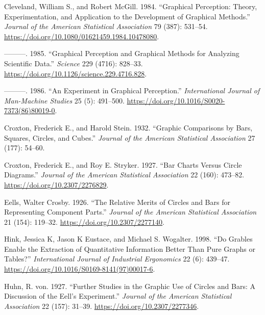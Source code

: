 \documentclass[
  10pt,
  letterpaper,
  twocolumn]{article}
\newlength{\cslhangindent}
\newlength{\cslentryspacingunit} %
\newenvironment{CSLReferences}[2] %
 {%
  \setlength{\parindent}{0pt}
  \ifodd #1
  \let\oldpar\par
  \def\par{\hangindent=\cslhangindent\oldpar}
  \fi
  \setlength{\parskip}{#2\cslentryspacingunit}
 }%
 {}
\begin{document}
\hypertarget{refs}{}
\begin{CSLReferences}{1}{0}
\leavevmode{}%
Cleveland, William S., and Robert McGill. 1984. {``Graphical Perception:
Theory, Experimentation, and Application to the Development of Graphical
Methods.''} \emph{Journal of the American Statistical Association} 79
(387): 531--54. \url{https://doi.org/10.1080/01621459.1984.10478080}.

\leavevmode{}%
---------. 1985. {``Graphical Perception and Graphical Methods for
Analyzing Scientific Data.''} \emph{Science} 229 (4716): 828--33.
\url{https://doi.org/10.1126/science.229.4716.828}.

\leavevmode{}%
---------. 1986. {``An Experiment in Graphical Perception.''}
\emph{International Journal of Man-Machine Studies} 25 (5): 491--500.
\url{https://doi.org/10.1016/S0020-7373(86)80019-0}.

\leavevmode{}%
Croxton, Frederick E., and Harold Stein. 1932. {``Graphic Comparisons by
Bars, Squares, Circles, and Cubes.''} \emph{Journal of the American
Statistical Association} 27 (177): 54--60.

\leavevmode{}%
Croxton, Frederick E., and Roy E. Stryker. 1927. {``Bar Charts Versus
Circle Diagrams.''} \emph{Journal of the American Statistical
Association} 22 (160): 473--82. \url{https://doi.org/10.2307/2276829}.

\leavevmode{}%
Eells, Walter Crosby. 1926. {``The Relative Merits of Circles and Bars
for Representing Component Parts.''} \emph{Journal of the American
Statistical Association} 21 (154): 119--32.
\url{https://doi.org/10.2307/2277140}.

\leavevmode{}%
Hink, Jessica K, Jason K Eustace, and Michael S. Wogalter. 1998. {``Do
Grables Enable the Extraction of Quantitative Information Better Than
Pure Graphs or Tables?''} \emph{International Journal of Industrial
Ergonomics} 22 (6): 439--47.
\url{https://doi.org/10.1016/S0169-8141(97)00017-6}.

\leavevmode{}%
Huhn, R. von. 1927. {``Further Studies in the Graphic Use of Circles and
Bars: A Discussion of the Eell's Experiment.''} \emph{Journal of the
American Statistical Association} 22 (157): 31--39.
\url{https://doi.org/10.2307/2277346}.

\end{CSLReferences}


\end{document}
